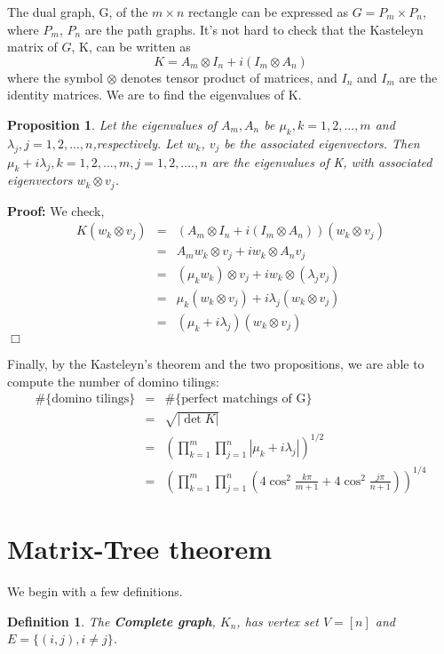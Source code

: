 \documentclass[11pt]{article}
\newtheorem{proposition}[theorem]{Proposition}
\newtheorem{definition}[theorem]{Definition}
\newenvironment{proof}{\noindent \textbf{Proof:}}{$\Box$}
\begin{document}
The dual graph, G, of the $m\times n$ rectangle can be expressed as $G=P_m\times P_n$, where $P_m$, $P_n$ are the path graphs. It's not hard to check that the Kasteleyn matrix of $G$, K, can be written as
$$K=A_m\otimes I_n+i(I_m\otimes A_n)$$
where the symbol $\otimes$ denotes tensor product of matrices, and $I_n$ and $I_m$ are the identity matrices. We are to find the eigenvalues of K.

\begin{proposition}
Let the eigenvalues of $A_m,A_n$ be $\mu_k,k=1,2,...,m$ and $\lambda_j, j=1,2,...,n$,respectively. Let $w_k$, $v_j$ be the associated eigenvectors. Then $\mu_k+i\lambda_j, k = 1,2,...,m, j = 1,2,....,n$ are the eigenvalues of K, with associated eigenvectors $w_k\otimes v_j$.
\end{proposition}

\begin{proof}
We check,
\begin{eqnarray*}
K(w_k\otimes v_j)
& = & (A_m\otimes I_n+i(I_m\otimes A_n))(w_k\otimes v_j)\\
& = & A_m w_k\otimes v_j+i w_k\otimes A_n v_j\\
& = & (\mu_k w_k)\otimes v_j+i w_k\otimes (\lambda_j v_j)\\
& = & \mu_k(w_k\otimes v_j)+i\lambda_j(w_k\otimes v_j)\\
& = & (\mu_k+i\lambda_j)(w_k\otimes v_j)
\end{eqnarray*}
\end{proof}

Finally, by the Kasteleyn's theorem and the two propositions, we are able to compute the number of domino tilings:
\begin{eqnarray*}
\#\{\text{domino tilings}\}
& = & \#\{\text{perfect matchings of G}\}\\
& = & \sqrt{|\det K|}\\
& = & (\prod_{k=1}^{m}\prod_{j=1}^{n}|\mu_k+i\lambda_j|)^{1/2}\\
& = & (\prod_{k=1}^{m}\prod_{j=1}^{n}(4\cos^2{\frac{k\pi}{m+1}}+4\cos^2{\frac{j\pi}{n+1}}))^{1/4}
\end{eqnarray*}

\section{Matrix-Tree theorem}

We begin with a few definitions.

\begin{definition}
The \textbf{Complete graph}, $K_n$, has vertex set $V=[n]$ and $E=\{(i,j),i\neq j\}$.
\end{definition}
\end{document}
